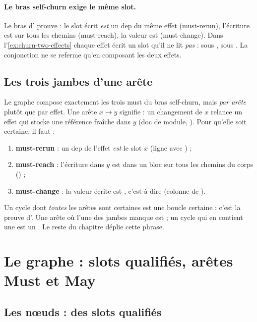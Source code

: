 \paragraph{Le bras self-churn exige le même slot.} Le bras d' prouve
 : le slot écrit \emph{est} un dep du
même effet (must-rerun), l'écriture est sur tous les chemins (must-reach), la valeur est
 (must-change). Dans l'\cref{ex:churn-two-effects} chaque effet écrit un slot
qu'il ne lit \emph{pas} :  sous \code{[a]},  sous \code{[b]}. La
conjonction ne se referme qu'en composant les deux effets.

\subsection{Les trois jambes d'une arête}

Le graphe compose exactement les trois must du bras self-churn, mais \emph{par arête}
plutôt que par effet. Une arête $x \to y$ signifie : \og un changement de $x$ relance un
effet qui stocke une référence fraîche dans $y$\fg{} (doc de module,
). Pour qu'elle soit certaine, il faut :
\begin{enumerate}
  \item \textbf{must-rerun} : un dep de l'effet \emph{est} le slot $x$ (ligne
         avec ) ;
  \item \textbf{must-reach} : l'écriture dans $y$ est dans un bloc sur tous les chemins du
        corps () ;
  \item \textbf{must-change} : la valeur écrite est , c'est-à-dire
         (colonne  de ).
\end{enumerate}
Un cycle dont \emph{toutes} les arêtes sont certaines est une boucle certaine : c'est la
preuve d'\Error. Une arête où l'une des jambes manque est  ; un cycle qui en
contient une est un \Warning. Le reste du chapitre déplie cette phrase.

\section{Le graphe : slots qualifiés, arêtes Must et May}
\label{sec:churn-graphe}

\subsection{Les nœuds : des slots qualifiés}

